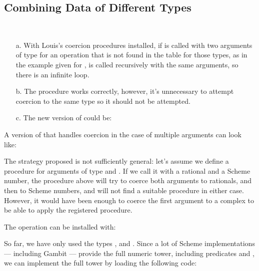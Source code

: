 \subsection{Combining Data of Different Types}

\begin{exe}[2.81]
    \ \vspace{-20pt}
    \begin{itemize}
        \item[a.] With Louis’s coercion procedures installed, if 
             is called with two arguments of type 
             for an operation that is not found in the table for 
            those types, as in the example given for , 
             is called recursively with the same arguments, 
            so there is an infinite loop.
        \item[b.]The   procedure works correctly, however, 
            it’s unnecessary to attempt coercion to the same type so it should 
            not be attempted.
        \item[c.] The new version of  could be:
    \end{itemize}
\end{exe}

\begin{exe}[2.82]
    A version of  that handles coercion in the case of 
    multiple arguments can look like:

    The strategy proposed is not sufficiently general: let’s assume we define 
    a procedure  for arguments of type  and 
    . If we call it with a rational and a Scheme number, the 
    procedure above will try to coerce both arguments to rationals, and then to 
    Scheme numbers, and will not find a suitable procedure in either case. 
    However, it would have been enough to coerce the first argument to a complex 
    to be able to apply the registered procedure.
\end{exe}

\begin{exe}[2.83]
    The  operation can be installed with:

    \begin{comp}
        So far, we have only used the types , 
         and . Since a lot of Scheme 
        implementations --- including Gambit --- provide the full numeric tower, 
        including predicates  and , we can implement 
        the full tower by loading the following code:
    \end{comp}
\end{exe}

